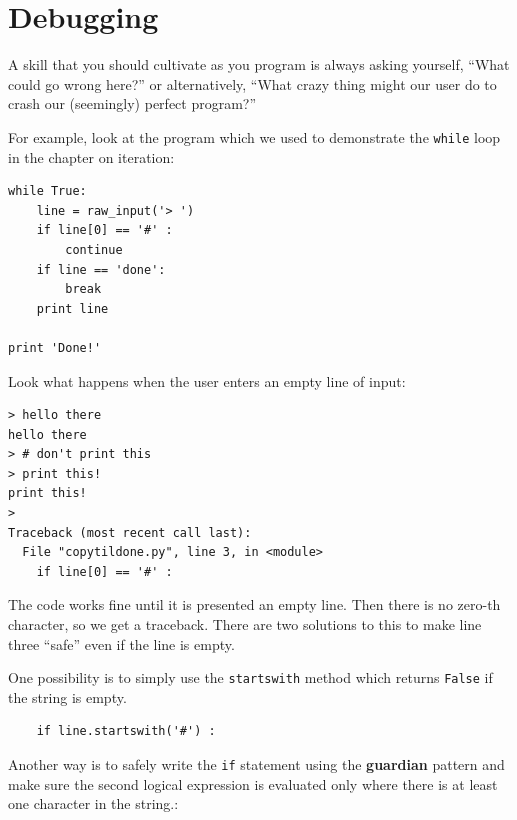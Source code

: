 {%



\section{Debugging}

A skill that you should cultivate as you program is always
asking yourself, ``What could go wrong here?'' or alternatively,
``What crazy thing might our user do to crash our (seemingly) 
perfect program?''

For example, look at the program which we used to demonstrate
the {\tt while} loop in the chapter on iteration:

\beforeverb
\begin{verbatim}
while True:
    line = raw_input('> ')
    if line[0] == '#' :
        continue
    if line == 'done':
        break
    print line

print 'Done!'
\end{verbatim}
\afterverb
%
Look what happens when the user enters an empty line of input:

\beforeverb
\begin{verbatim}
> hello there
hello there
> # don't print this
> print this!
print this!
> 
Traceback (most recent call last):
  File "copytildone.py", line 3, in <module>
    if line[0] == '#' :
\end{verbatim}
\afterverb
%
The code works fine until it is presented an empty line.  Then
there is no zero-th character, so we get a traceback.  There are two
solutions to this to make line three ``safe'' even if the line is 
empty.

One possibility is to simply use the {\tt startswith} method
which returns {\tt False} if the string is empty.

\beforeverb
\begin{verbatim}
    if line.startswith('#') :
\end{verbatim}
\afterverb
%
Another way is to safely write the {\tt if} statement using the {\bf guardian}
pattern and make sure the second logical expression is evaluated 
only where there is at least one character in the string.:

}
